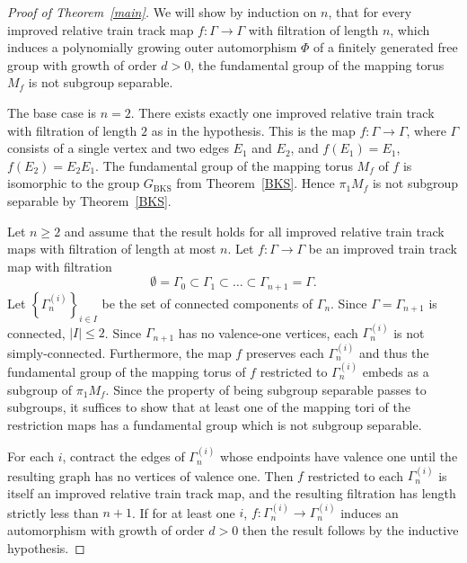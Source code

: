 \begin{proof}[Proof of Theorem~\ref{main}]
We will show by induction on $n$, that for every improved relative train track map $f \colon \Gamma \to \Gamma$ with filtration of length $n$, which induces a polynomially growing outer automorphism $\Phi$ of a finitely generated free group with growth of order $d > 0$, the fundamental group of the mapping torus $M_f$ is not subgroup separable.

The base case is $n = 2$. There exists exactly one improved relative train track with filtration of length $2$ as in the hypothesis. This is the map $f \colon \Gamma \to \Gamma$, where $\Gamma$ consists of a single vertex and two edges $E_1$ and $E_2$, and $f(E_1) = E_1$, $f(E_2) = E_2E_1$. The fundamental group of the mapping torus $M_f$ of $f$ is isomorphic to the group $G_{\mathrm{BKS}}$ from Theorem~\ref{BKS}. Hence $\pi_1 M_f$ is not subgroup separable by Theorem~\ref{BKS}.

Let $n\geq 2$ and assume that the result holds for all improved relative train track maps with filtration of length at most $n$. Let $f \colon \Gamma \to \Gamma$ be an improved train track map with filtration \[\emptyset = \Gamma_0 \subset \Gamma_1 \subset \ldots \subset \Gamma_{n+1} = \Gamma.\] Let $\left\{\Gamma_n^{(i)}\right\}_{i\in I}$ be the set of connected components of $\Gamma_n$. Since $\Gamma = \Gamma_{n+1}$ is connected, $|I| \leq 2$. Since $\Gamma_{n+1}$ has no valence-one vertices, each $\Gamma_n^{(i)}$ is not simply-connected. Furthermore, the map $f$ preserves each $\Gamma_n^{(i)}$ and thus the fundamental group of the mapping torus of $f$ restricted to $\Gamma^{(i)}_n$ embeds as a subgroup of $\pi_1 M_f$. Since the property of being subgroup separable passes to subgroups, it suffices to show that at least one of the mapping tori of the restriction maps has a fundamental group which is not subgroup separable.

For each $i$, contract the edges of $\Gamma_n^{(i)}$ whose endpoints have valence one until the resulting graph has no vertices of valence one. Then $f$ restricted to each $\Gamma^{(i)}_n$ is itself an improved relative train track map, and the resulting filtration has length strictly less than $n+1$. If for at least one $i$, $f \colon \Gamma_n^{(i)} \to \Gamma_n^{(i)}$ induces an automorphism with growth of order $d > 0$ then the result follows by the inductive hypothesis. %


\end{proof}
